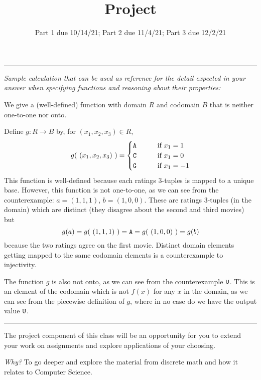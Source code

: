 \begin{enumerate}
    \rule{0.5\textwidth}{.4pt}

    {\it Sample calculation that can be used as reference for the detail expected 
    in your answer when specifying functions and reasoning about their properties:} 
    
    We give a (well-defined) function with domain $R$ and codomain $B$ that is neither one-to-one nor onto.

    Define $g: R \to B$ by, for $(x_1, x_2,x_3) \in R$,
    \[
        g(~(x_1, x_2, x_3)~) = \begin{cases} 
            \texttt{A} \qquad &\text{if $x_1 = 1$} \\
            \texttt{C} \qquad &\text{if $x_1 = 0$} \\
            \texttt{G} \qquad &\text{if $x_1 = -1$}
        \end{cases}
    \]
    This function is well-defined because each ratings $3$-tuples is mapped to a unique base.
    However, this function is not one-to-one, as we can see from the counterexample: 
    $a = (1,1,1)$, $b = (1, 0,0)$. These are ratings $3$-tuples (in the domain) which are 
    distinct (they disagree about the second and third movies) but
    \[
        g(a) = g(~(1,1,1)~) = \texttt{A} = g(~(1,0,0)~) = g(b)
    \]
    because the two ratings agree on the first movie. Distinct domain 
    elements getting mapped to the same codomain elements is a counterexample to injectivity.

    The function $g$ is also not onto, as we can see from the counterexample $\texttt{U}$. This is an 
    element of the codomain which is not $f(x)$ for any $x$ in the domain, as we can see 
    from the piecewise definition of $g$, where in no case do we have the output value $\texttt{U}$.
    \rule{0.5\textwidth}{.4pt}


\end{enumerate}


    
\newpage

\title{Project}
\date{Part 1 due 10/14/21; Part 2 due 11/4/21; Part 3 due 12/2/21}


\maketitle
\thispagestyle{fancy}
The project component of this class will be an opportunity for you to extend your 
work on assignments and explore applications of your choosing. 

{\it Why?}
To go deeper and explore the material from discrete math and how it relates to Computer Science.

